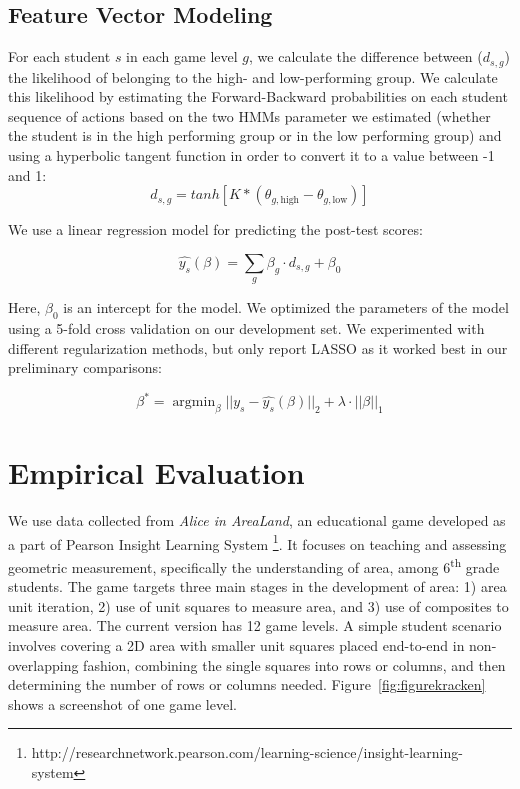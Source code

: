 \documentclass{sigchi}
\DeclareMathOperator*{\argmin}{argmin}
\begin{document}
	\subsection{Feature Vector Modeling}
	
	For each student $s$ in each game level $g$, we calculate the difference between ($d_{s,g}$) the likelihood of belonging to the high- and low-performing group.
	We calculate this likelihood by estimating the Forward-Backward probabilities  on each student sequence of actions  based on the two HMMs parameter we estimated (whether the student is in the high performing group or in the low performing group) and using a hyperbolic tangent function in order to convert it to a value between -1 and 1: 
	\begin{equation}
	d_{s,g} = tanh[ K * (\theta_{g, \text{high}} - \theta_{g, \text{low}})]
	\end{equation}
	
	We use  a linear regression model for predicting the post-test scores:
	
	\begin{equation}
	\hat {y_s}(\beta) =   \sum_g \beta_g \cdot d_{s,g}  + \beta_0
	\end{equation}
	
	Here, $\beta_0$ is an intercept for the  model.  
	We optimized the parameters of the model using a 5-fold cross validation on our development set.
	We experimented with different regularization methods, but only report LASSO \cite{tibshirani1996regression} as it worked best in our preliminary comparisons:

	\begin{equation}
	\beta^* = \argmin_\beta || y_s - \hat{y_s}(\beta)  ||_2 + \lambda \cdot || \beta ||_1
	\end{equation}
			
	\section{Empirical Evaluation}
	\label{sec:experiments}
	
	
	We use data collected from \textit {Alice in AreaLand},  an educational game developed as a part of Pearson Insight Learning System \footnote{http://researchnetwork.pearson.com/learning-science/insight-learning-system}. 
	It focuses on teaching and assessing geometric measurement, specifically the understanding of area, among 6\textsuperscript{th} grade students. 
	The game targets three main stages in the development of area: 1) area unit iteration, 2) use of unit squares to measure area, and 3) use of composites to measure area. 
	The current version has 12 game levels. 
	A simple student scenario involves covering a 2D area with smaller unit squares placed end-to-end in non-overlapping fashion, combining the single squares into rows or columns, and then determining the number of rows or columns needed. 
	Figure~\ref{fig:figurekracken} shows a screenshot of one game level.
	
\end{document}
